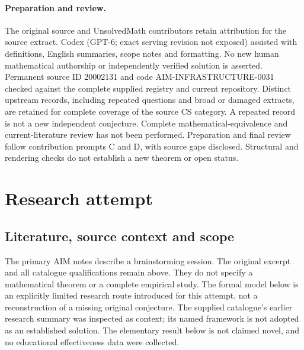 \documentclass[11pt]{article}
\begin{document}
\paragraph{Preparation and review.}
The original source and UnsolvedMath contributors retain attribution for the source extract. Codex (GPT-6; exact serving revision not exposed) assisted with definitions, English summaries, scope notes and formatting. No new human mathematical authorship or independently verified solution is asserted. Permanent source ID 20002131 and code AIM-INFRASTRUCTURE-0031 checked against the complete supplied registry and current repository. Distinct upstream records, including repeated questions and broad or damaged extracts, are retained for complete coverage of the source CS category. A repeated record is not a new independent conjecture. Complete mathematical-equivalence and current-literature review has not been performed. Preparation and final review follow contribution prompts C and D, with source gaps disclosed. Structural and rendering checks do not establish a new theorem or open status.
\label{end:20002131}

\section{Research attempt}
\subsection{Literature, source context and scope}
The primary AIM notes describe a brainstorming session. The original excerpt and all catalogue qualifications remain above. They do not specify a mathematical theorem or a complete empirical study. The formal model below is an explicitly limited research route introduced for this attempt, not a reconstruction of a missing original conjecture. The supplied catalogue's earlier research summary was inspected as context; its named framework is not adopted as an established solution. The elementary result below is not claimed novel, and no educational effectiveness data were collected.
\end{document}
